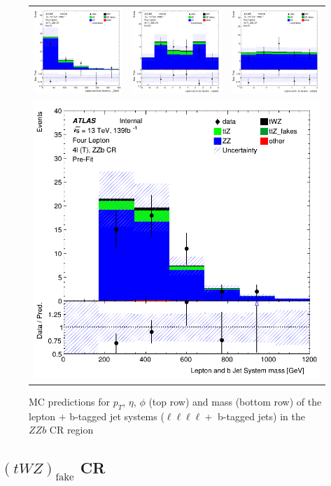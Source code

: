 \begin{figure}[htbp]
\centering
  \begin{tabular}{ccc}

    \includegraphics[width=.2\textwidth]{figures/PreFitPlots/lep4_ZZb_4T_bJets_Leps_sys_pt}&
    \includegraphics[width=.2\textwidth]{figures/PreFitPlots/lep4_ZZb_4T_bJets_Leps_sys_eta} &
    \includegraphics[width=.2\textwidth]{figures/PreFitPlots/lep4_ZZb_4T_bJets_Leps_sys_phi} \\
    \multicolumn{3}{c}{\includegraphics[width=.2\textwidth]{figures/PreFitPlots/lep4_ZZb_4T_bJets_Leps_sys_mass}}

  \end{tabular}
    \caption{MC predictions for $p_{T}$, $\eta$, $\phi$ (top row) and mass (bottom row) of the lepton $+$ b-tagged jet systems ($\ell \ell \ell \ell + $ b-tagged jets) in the $ZZb$ CR region }
  \label{fig:4lep-ZZb-CR-bjet-and-leps-sys-Plots}
\end{figure}



\subsection{$(tWZ)_{\text{fake}}$ CR}
\label{sec:app-controlplotstetralepton-tWZ-3T1L-CR}

